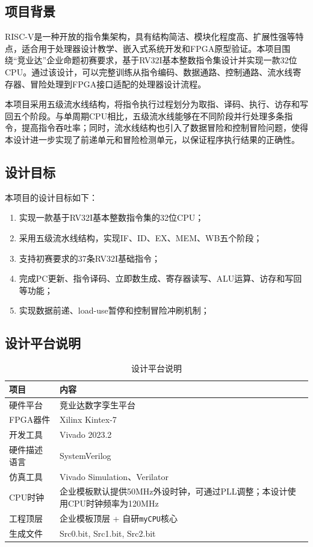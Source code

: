 \documentclass[UTF8,a4paper,12pt]{ctexart}
\newcommand{\code}[1]{\texttt{#1}}
\begin{document}
\subsection{项目背景}

RISC-V是一种开放的指令集架构，具有结构简洁、模块化程度高、扩展性强等特点，适合用于处理器设计教学、嵌入式系统开发和FPGA原型验证。本项目围绕``竞业达''企业命题初赛要求，基于RV32I基本整数指令集设计并实现一款32位CPU。通过该设计，可以完整训练从指令编码、数据通路、控制通路、流水线寄存器、冒险处理到FPGA接口适配的处理器设计流程。

本项目采用五级流水线结构，将指令执行过程划分为取指、译码、执行、访存和写回五个阶段。与单周期CPU相比，五级流水线能够在不同阶段并行处理多条指令，提高指令吞吐率；同时，流水线结构也引入了数据冒险和控制冒险问题，使得本设计进一步实现了前递单元和冒险检测单元，以保证程序执行结果的正确性。

\subsection{设计目标}

本项目的设计目标如下：

\begin{enumerate}
    \item 实现一款基于RV32I基本整数指令集的32位CPU；
    \item 采用五级流水线结构，实现IF、ID、EX、MEM、WB五个阶段；
    \item 支持初赛要求的37条RV32I基础指令；
    \item 完成PC更新、指令译码、立即数生成、寄存器读写、ALU运算、访存和写回等功能；
    \item 实现数据前递、load-use暂停和控制冒险冲刷机制；

\end{enumerate}

\subsection{设计平台说明}

\begin{table}[H]
\centering
\caption{设计平台说明}
\begin{tabularx}{\textwidth}{p{4cm}X}
\toprule
项目 & 内容 \\
\midrule
硬件平台 & {竞业达数字孪生平台} \\
FPGA器件 & {Xilinx Kintex-7} \\
开发工具 & {Vivado 2023.2} \\
硬件描述语言 & SystemVerilog \\
仿真工具 & {Vivado Simulation、Verilator} \\
CPU时钟 & 企业模板默认提供50MHz外设时钟，可通过PLL调整；本设计使用CPU时钟频率为{120MHz} \\
工程顶层 & 企业模板顶层 + 自研\code{myCPU}核心 \\
生成文件 & {Src0.bit, Src1.bit, Src2.bit} \\
\bottomrule
\end{tabularx}
\end{table}
\end{document}
